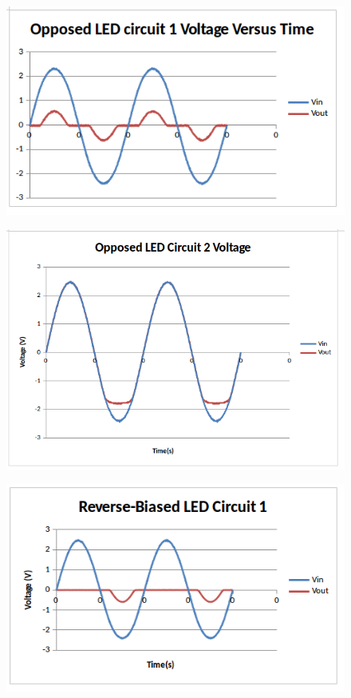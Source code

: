 \documentclass[10pt]{article}
\begin{document}
\begin{figure}[H]
	\centering
	\includegraphics[width=\textwidth]{Opposed1}
\end{figure}
\begin{figure}[H]
	\centering
	\includegraphics[width=\textwidth]{Opposed2}
\end{figure}
\begin{figure}[H]
	\centering
	\includegraphics[width=\textwidth]{Reversed1}
\end{figure}
\end{document}
